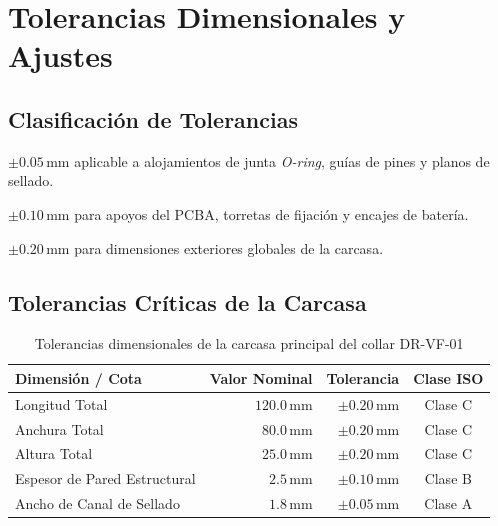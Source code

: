 \section{Tolerancias Dimensionales y Ajustes}

\subsection{Clasificación de Tolerancias}

\begin{description}[leftmargin=*, style=nextline, font=\bfseries\ttfamily]
    \item[Clase A (Crítica)] $\pm 0.05\,\text{mm}$ aplicable a alojamientos de junta \textit{O-ring}, guías de pines y planos de sellado.
    \item[Clase B (Importante)] $\pm 0.10\,\text{mm}$ para apoyos del PCBA, torretas de fijación y encajes de batería.
    \item[Clase C (General)] $\pm 0.20\,\text{mm}$ para dimensiones exteriores globales de la carcasa.
\end{description}

\subsection{Tolerancias Críticas de la Carcasa}

\begin{table}[H]
\centering
\caption{Tolerancias dimensionales de la carcasa principal del collar DR-VF-01}
\label{tab:tolerancias_carcasa}
\vspace{2mm}
\begin{tabularx}{\textwidth}{X r r c}
\toprule
\rowcolor{categorybg}
\textbf{Dimensión / Cota} & \textbf{Valor Nominal} & \textbf{Tolerancia} & \textbf{Clase ISO} \\
\midrule
Longitud Total & $120.0\,\text{mm}$ & $\pm 0.20\,\text{mm}$ & Clase C \\
\rowcolor{rowalt}
Anchura Total & $80.0\,\text{mm}$ & $\pm 0.20\,\text{mm}$ & Clase C \\
Altura Total & $25.0\,\text{mm}$ & $\pm 0.20\,\text{mm}$ & Clase C \\
\rowcolor{rowalt}
Espesor de Pared Estructural & $2.5\,\text{mm}$ & $\pm 0.10\,\text{mm}$ & Clase B \\
Ancho de Canal de Sellado & $1.8\,\text{mm}$ & $\pm 0.05\,\text{mm}$ & Clase A \\
\bottomrule
\end{tabularx}
\end{table}

